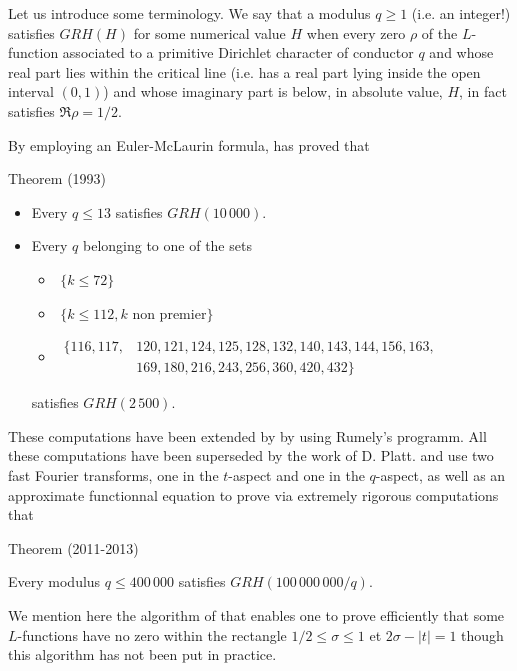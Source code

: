 Let us introduce some terminology. We say that a modulus $q\ge1$ (i.e. an
integer!) satisfies $GRH(H)$ for some numerical value $H$ when
every zero $\rho$ of the $L$-function associated to a primitive Dirichlet
character of conductor $q$ and whose real part lies within the critical line (i.e. has a
real part lying inside the open interval $(0,1)$) and whose imaginary part is
below, in absolute value, $H$, in fact satisfies $\Re\rho=1/2$.

By employing an Euler-McLaurin formula,
\cite{Rumely*93}
has proved that

\begin{thm}{Theorem (1993)}

  \begin{itemize}
  \item Every $q\le 13$ satisfies $GRH(10\,000)$.

  \item Every $q$ belonging to one of the sets
  \begin{itemize}
    \item \,\,$\{k\le 72\}$

    \item \,\,$\{k\le 112, \text{$k$ non premier}\}$

    \item \,$\begin{aligned}\{116, 117, &120, 121, 124, 125, 128, 132, 140,
     143, 144, 156, 163, \\ &169, 180, 216, 243, 256, 360, 420, 432\}\end{aligned}$

    \end{itemize}
    satisfies $GRH(2\,500)$.
    

    \end{itemize}
\end{thm}

These computations have been extended by 
\cite{Bennett*01}
by using Rumely's programm. All these computations have been
superseded by the work of D. Platt.
\cite{Platt*11} and
\cite{Platt*13}
use two fast Fourier transforms, one in the $t$-aspect and one in the
$q$-aspect, as well as an approximate functionnal equation to prove via
extremely rigorous computations that
\begin{thm}{Theorem (2011-2013)}

  Every modulus $q\le 400\,000$ satisfies
    $GRH(100\,000\,000/q)$.
\end{thm}


We mention here the algorithm of
\cite{Omar*01}
that enables one to prove efficiently that some $L$-functions have no zero
    within the rectangle
$1/2\le \sigma\le1$ et $2\sigma-|t|=1$ though this algorithm has not been put
    in practice.

